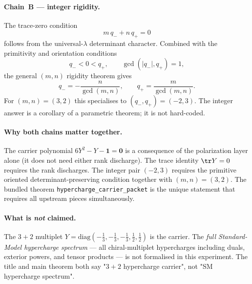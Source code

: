 \paragraph{Chain~B --- integer rigidity.}
The trace-zero condition
\[
m\,q_- + n\,q_+ = 0
\]
follows from the universal-$\lambda$ determinant character. Combined
with the primitivity and orientation conditions
\[
q_- < 0 < q_+,\qquad
\gcd(|q_-|, q_+) = 1,
\]
the general $(m,n)$ rigidity theorem gives
\[
q_- = -\frac{n}{\gcd(m,n)},\qquad q_+ = \frac{m}{\gcd(m,n)}.
\]
For $(m,n) = (3,2)$ this specialises to $(q_-,q_+) = (-2,3)$.
The integer answer is a corollary of a parametric theorem; it is
not hard-coded.

\paragraph{Why both chains matter together.}
The carrier polynomial $6 Y^2 - Y - \mathbf 1 = \mathbf 0$ is a
consequence of the polarization layer alone (it does not need
either rank discharge). The trace identity $\tr Y = 0$ requires
the rank discharges. The integer pair $(-2, 3)$ requires the
primitive oriented determinant-preserving condition together
with $(m, n) = (3, 2)$. The bundled theorem
\texttt{hypercharge\_carrier\_packet} is the unique statement
that requires all upstream pieces simultaneously.

\paragraph{What is \emph{not} claimed.} The $3+2$ multiplet
$Y = \mathrm{diag}(-\tfrac13, -\tfrac13, -\tfrac13, \tfrac12, \tfrac12)$
is the carrier. The \emph{full Standard-Model hypercharge
spectrum} --- all chiral-multiplet hypercharges including duals,
exterior powers, and tensor products --- is not formalised in
this experiment. The title and main theorem both say "$3+2$
hypercharge carrier", not "SM hypercharge spectrum".

